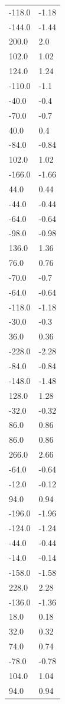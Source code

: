 \begin{longtable}{ll}
-118.0 & -1.18 \\
-144.0 & -1.44 \\
200.0 & 2.0 \\
102.0 & 1.02 \\
124.0 & 1.24 \\
-110.0 & -1.1 \\
-40.0 & -0.4 \\
-70.0 & -0.7 \\
40.0 & 0.4 \\
-84.0 & -0.84 \\
102.0 & 1.02 \\
-166.0 & -1.66 \\
44.0 & 0.44 \\
-44.0 & -0.44 \\
-64.0 & -0.64 \\
-98.0 & -0.98 \\
136.0 & 1.36 \\
76.0 & 0.76 \\
-70.0 & -0.7 \\
-64.0 & -0.64 \\
-118.0 & -1.18 \\
-30.0 & -0.3 \\
36.0 & 0.36 \\
-228.0 & -2.28 \\
-84.0 & -0.84 \\
-148.0 & -1.48 \\
128.0 & 1.28 \\
-32.0 & -0.32 \\
86.0 & 0.86 \\
86.0 & 0.86 \\
266.0 & 2.66 \\
-64.0 & -0.64 \\
-12.0 & -0.12 \\
94.0 & 0.94 \\
-196.0 & -1.96 \\
-124.0 & -1.24 \\
-44.0 & -0.44 \\
-14.0 & -0.14 \\
-158.0 & -1.58 \\
228.0 & 2.28 \\
-136.0 & -1.36 \\
18.0 & 0.18 \\
32.0 & 0.32 \\
74.0 & 0.74 \\
-78.0 & -0.78 \\
104.0 & 1.04 \\
94.0 & 0.94 \\

\end{longtable}

